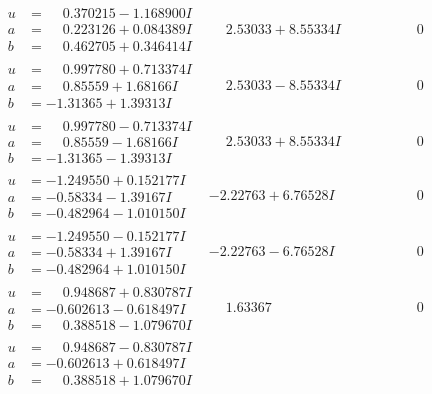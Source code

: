 \documentclass[1p]{elsarticle_modified}
\theoremstyle{definition}
\begin{document}
$$\begin{array}{c|c|c}
\begin{aligned}
u &= \phantom{-}0.370215 - 1.168900 I \\
a &= \phantom{-}0.223126 + 0.084389 I \\
b &= \phantom{-}0.462705 + 0.346414 I\end{aligned}
 & \phantom{-}2.53033 + 8.55334 I & \phantom{-0.000000 } 0 \\ \hline\begin{aligned}
u &= \phantom{-}0.997780 + 0.713374 I \\
a &= \phantom{-}0.85559 + 1.68166 I \\
b &= -1.31365 + 1.39313 I\end{aligned}
 & \phantom{-}2.53033 - 8.55334 I & \phantom{-0.000000 } 0 \\ \hline\begin{aligned}
u &= \phantom{-}0.997780 - 0.713374 I \\
a &= \phantom{-}0.85559 - 1.68166 I \\
b &= -1.31365 - 1.39313 I\end{aligned}
 & \phantom{-}2.53033 + 8.55334 I & \phantom{-0.000000 } 0 \\ \hline\begin{aligned}
u &= -1.249550 + 0.152177 I \\
a &= -0.58334 - 1.39167 I \\
b &= -0.482964 - 1.010150 I\end{aligned}
 & -2.22763 + 6.76528 I & \phantom{-0.000000 } 0 \\ \hline\begin{aligned}
u &= -1.249550 - 0.152177 I \\
a &= -0.58334 + 1.39167 I \\
b &= -0.482964 + 1.010150 I\end{aligned}
 & -2.22763 - 6.76528 I & \phantom{-0.000000 } 0 \\ \hline\begin{aligned}
u &= \phantom{-}0.948687 + 0.830787 I \\
a &= -0.602613 - 0.618497 I \\
b &= \phantom{-}0.388518 - 1.079670 I\end{aligned}
 & \phantom{-}1.63367\phantom{ +0.000000I} & \phantom{-0.000000 } 0 \\ \hline\begin{aligned}
u &= \phantom{-}0.948687 - 0.830787 I \\
a &= -0.602613 + 0.618497 I \\
b &= \phantom{-}0.388518 + 1.079670 I\end{aligned}

\end{array}$$
\end{document}
